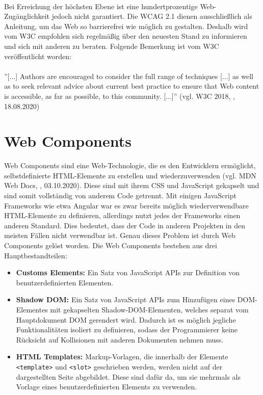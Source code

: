 \mbox{}\\
Bei Erreichung der höchsten Ebene ist eine hundertprozentige Web-Zugänglichkeit jedoch nicht garantiert. Die WCAG 2.1 dienen ausschließlich als Anleitung, um das Web so barrierefrei wie möglich zu gestalten. Deshalb wird vom W3C empfohlen sich regelmäßig über den neuesten Stand zu informieren und sich mit anderen zu beraten. Folgende Bemerkung ist vom W3C veröffentlicht worden:\\

\mbox{}\\
''[...] Authors are encouraged to consider the full range of techniques [...] as well as to seek relevant advice about current best practice to ensure that Web content is accessible, as far as possible, to this community. [...]'' (vgl. W3C 2018, \cite{wcag_2_1_2018}, 18.08.2020)

\section{Web Components}
\label{web_comp}
Web Components sind eine Web-Technologie, die es den Entwicklern ermöglicht, selbstdefinierte HTML-Elemente zu erstellen und wiederzuverwenden (vgl. MDN Web Docs, \cite{moz_webcomp_2019}, 03.10.2020). Diese sind mit ihrem CSS und JavaScript gekapselt und sind somit vollständig von anderem Code getrennt. Mit einigen JavaScript Frameworks wie etwa Angular war es zwar bereits möglich wiederverwendbare HTML-Elemente zu definieren, allerdings nutzt jedes der Frameworks einen anderen Standard. Dies bedeutet, dass der Code in anderen Projekten in den meisten Fällen nicht verwendbar ist. Genau dieses Problem ist durch Web Components gelöst worden. Die Web Components bestehen aus drei Hauptbestandteilen:

\begin{itemize}
	\item \textbf{Customs Elements:} Ein Satz von JavaScript APIs zur Definition von benutzerdefinierten Elementen.
	\item \textbf{Shadow DOM:} Ein Satz von JavaScript APIs zum Hinzufügen eines DOM-Elementes mit gekapselten Shadow-DOM-Elementen, welches separat vom Hauptdokument DOM gerendert wird. Dadurch ist es möglich jegliche Funktionalitäten isoliert zu definieren, sodass der Programmierer keine Rücksicht auf Kollisionen mit anderen Dokumenten nehmen muss.
	\item \textbf{HTML Templates:} Markup-Vorlagen, die innerhalb der Elemente \texttt{<template>} und \texttt{<slot>} geschrieben werden, werden nicht auf der dargestellten Seite abgebildet. Diese sind dafür da, um sie mehrmals als Vorlage eines benutzerdefinierten Elements zu verwenden.
\end{itemize}

